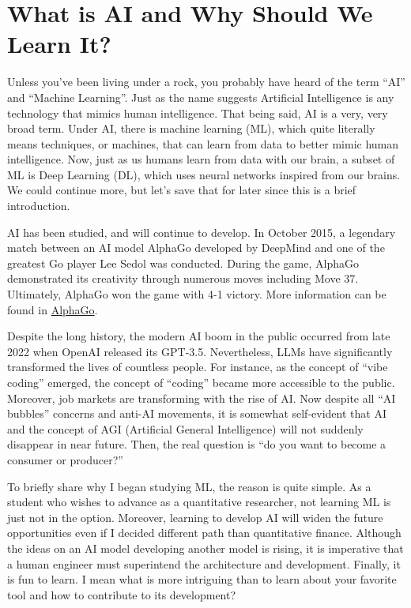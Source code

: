 \documentclass[../../main.tex]{subfiles}
\begin{document}
\chapter*{What is AI and Why Should We Learn It?}

Unless you've been living under a rock, you probably have heard of
the term ``AI'' and ``Machine Learning''. Just as the name suggests
Artificial Intelligence is any technology that mimics human
intelligence. That being said, AI is a very, very broad term.
Under AI, there is machine learning (ML), which quite literally
means techniques, or machines, that can learn from data to better
mimic human intelligence. Now, just as us humans learn from data
with our brain, a subset of ML is Deep Learning (DL), which uses
neural networks inspired from our brains. We could continue more,
but let's save that for later since this is a brief introduction.

AI has been studied, and will continue to develop. In October 2015,
a legendary match between an AI model AlphaGo developed by DeepMind
and one of the greatest Go player Lee Sedol was conducted. During
the game, AlphaGo demonstrated its creativity through numerous
moves including Move 37. Ultimately, AlphaGo won the game with
4-1 victory. More information can be found in
\href{https://deepmind.google/research/alphago/}{AlphaGo}.

Despite the long history, the modern AI boom in the public
occurred from late 2022 when OpenAI released its GPT-3.5.
Nevertheless, LLMs have significantly transformed the lives of
countless people. For instance, as the concept of ``vibe coding''
emerged, the concept of ``coding'' became more accessible to the
public. Moreover, job markets are transforming with the rise of
AI. Now despite all ``AI bubbles'' concerns and anti-AI movements,
it is somewhat self-evident that AI and the concept of AGI
(Artificial General Intelligence) will not suddenly disappear
in near future. Then, the real question is ``do you want to
become a consumer or producer?''

To briefly share why I began studying ML, the reason is quite
simple. As a student who wishes to advance as a quantitative
researcher, not learning ML is just not in the option. Moreover,
learning to develop AI will widen the future opportunities even
if I decided different path than quantitative finance. Although
the ideas on an AI model developing another model is rising,
it is imperative that a human engineer must superintend the
architecture and development. Finally, it is fun to learn.
I mean what is more intriguing than to learn about your favorite
tool and how to contribute to its development?
\end{document}
